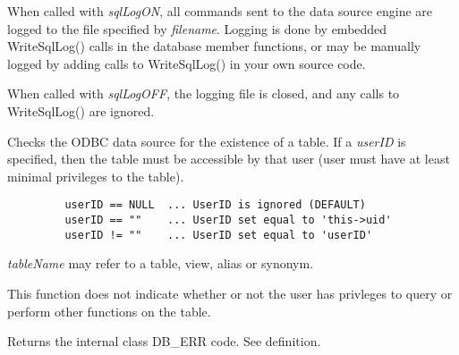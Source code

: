 
When called with {\it sqlLogON}, all commands sent to the data source engine are logged to the file specified by {\it filename}.  Logging is done by embedded WriteSqlLog() calls in the database member functions, or may be manually logged by adding calls to WriteSqlLog() in your own source code.

When called with {\it sqlLogOFF}, the logging file is closed, and any calls to WriteSqlLog() are ignored.


\label{wxdbtablexists}


Checks the ODBC data source for the existence of a table.  If a {\it userID} is specified, then the table must be accessible by that user (user must have at least minimal privileges to the table).



\begin{verbatim}
         userID == NULL  ... UserID is ignored (DEFAULT)
         userID == ""    ... UserID set equal to 'this->uid'
         userID != ""    ... UserID set equal to 'userID'
\end{verbatim}


{\it tableName} may refer to a table, view, alias or synonym.

This function does not indicate whether or not the user has privleges to query or perform other functions on the table.


\label{wxdbtranslatesqlstate}





Returns the internal class DB_ERR code.  See  definition.


